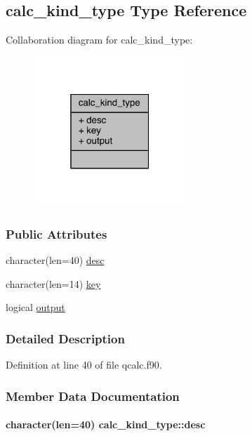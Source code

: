 \hypertarget{structcalc__kind__type}{\subsection{calc\-\_\-kind\-\_\-type Type Reference}
\label{structcalc__kind__type}
}


Collaboration diagram for calc\-\_\-kind\-\_\-type\-:
\nopagebreak
\begin{figure}[H]
\begin{center}
\leavevmode
\includegraphics[width=163pt]{structcalc__kind__type__coll__graph}
\end{center}
\end{figure}
\subsubsection*{Public Attributes}
\begin{DoxyCompactItemize}
\item 
character(len=40) \hyperlink{structcalc__kind__type_a0d467a665291d2896a86210c3e902daa}{desc}
\item 
character(len=14) \hyperlink{structcalc__kind__type_a599466b5a5180588df96533095eb465f}{key}
\item 
logical \hyperlink{structcalc__kind__type_a71d007604eeaa1cbddfa68dd79c8f2ec}{output}
\end{DoxyCompactItemize}


\subsubsection{Detailed Description}


Definition at line 40 of file qcalc.\-f90.



\subsubsection{Member Data Documentation}
\hypertarget{structcalc__kind__type_a0d467a665291d2896a86210c3e902daa}{
\paragraph[{desc}]{\setlength{\rightskip}{0pt plus 5cm}character(len=40) calc\-\_\-kind\-\_\-type\-::desc}}\label{structcalc__kind__type_a0d467a665291d2896a86210c3e902daa}


